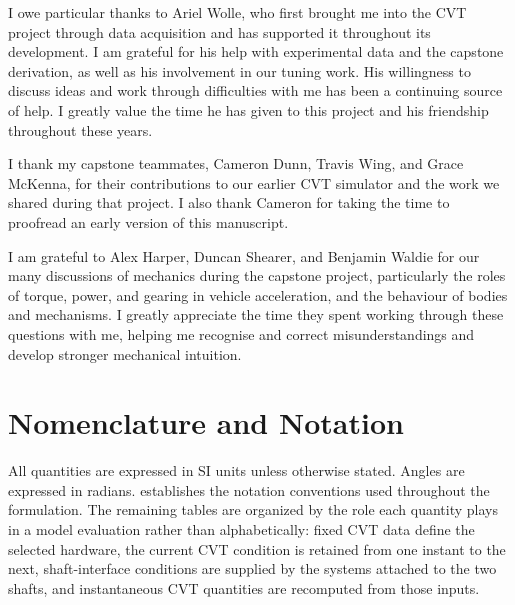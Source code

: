 \documentclass[11pt]{report}
\numberwithin{equation}{section}
\begin{document}
I owe particular thanks to Ariel Wolle, who first brought me into the CVT project 
through data acquisition and has supported it throughout its development. I am 
grateful for his help with experimental data and the capstone derivation, as well 
as his involvement in our tuning work. His willingness to discuss ideas and work 
through difficulties with me has been a continuing source of help. I greatly 
value the time he has given to this project and his friendship throughout these 
years.

I thank my capstone teammates, Cameron Dunn, Travis Wing, and Grace McKenna, for 
their contributions to our earlier CVT simulator and the work we shared during 
that project. I also thank Cameron for taking the time to proofread an early 
version of this manuscript.

I am grateful to Alex Harper, Duncan Shearer, and Benjamin Waldie for our many 
discussions of mechanics during the capstone project, particularly the roles of 
torque, power, and gearing in vehicle acceleration, and the behaviour of bodies 
and mechanisms. I greatly appreciate the time they spent working through these 
questions with me, helping me recognise and correct misunderstandings and develop 
stronger mechanical intuition.

\newpage
\tableofcontents
{}

\chapter*{Nomenclature and Notation}

\let\bodythetable\thetable
\let\bodytheHtable\theHtable
\setcounter{table}{0}
\renewcommand{\thetable}{N.\arabic{table}}
\renewcommand{\theHtable}{N.\arabic{table}}

All quantities are expressed in SI units unless otherwise stated. Angles are
expressed in radians.  establishes the notation
conventions used throughout the formulation. The remaining tables are organized
by the role each quantity plays in a model evaluation rather than alphabetically:
fixed CVT data define the selected hardware, the current CVT condition is retained
from one instant to the next, shaft-interface conditions are supplied by the
systems attached to the two shafts, and instantaneous CVT quantities are
recomputed from those inputs.
\end{document}
